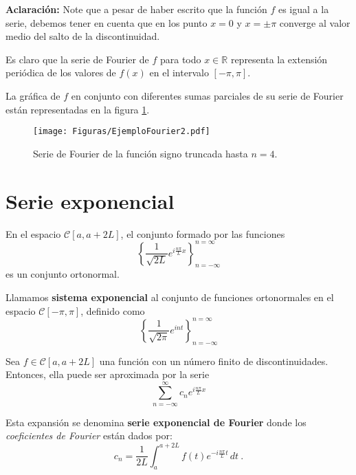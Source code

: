 \begin{ejemplo}
\textbf{Aclaración:} Note que a pesar de haber escrito que la función $f$ es igual a la serie, debemos tener en cuenta que en los punto $x = 0$ y $x = \pm \pi$ converge al valor medio del salto de la discontinuidad.

Es claro que la serie de Fourier de $f$ para todo $x\in \mathbb{R}$ representa la extensión periódica de los valores de $f(x)$ en el intervalo $[-\pi,\pi]$.

La gráfica de $f$ en conjunto con diferentes sumas parciales de su serie de Fourier están representadas en la figura \ref{fig:EjemploFourier2}.

\begin{figure}[H]
    \centering
    \texttt{[image: Figuras/EjemploFourier2.pdf]}
    \caption{Serie de Fourier de la función signo truncada hasta $n = 4$.}
     \label{fig:EjemploFourier2}
\end{figure}

\end{ejemplo}

\section{Serie exponencial}

\begin{propo}
    En el espacio $\mathscr{C}[a,a+2L]$, el conjunto formado por las funciones 
    \begin{equation}
        \left\{ \frac{1}{\sqrt{2L}} e^{i\frac{n\pi}{L}x} \right\}_{n= - \infty}^{n = \infty}
    \end{equation}
    es un conjunto ortonormal.
\end{propo}

\begin{defi} 
    Llamamos \textbf{sistema exponencial} al conjunto de funciones ortonormales en el espacio $\mathscr{C}[-\pi,\pi]$, definido como 
    $$\left\{ \frac{1}{\sqrt{2\pi}} e^{int} \right\}_{n= - \infty}^{n = \infty}$$
\end{defi}

\begin{defi} 
Sea $f \in \mathscr{C}[a,a+2L]$ una función con un número finito de discontinuidades. Entonces, ella puede ser aproximada por la serie 
\begin{equation}
     \sum_{n=- \infty}^{\infty} c_n e^{i\frac{n\pi}{L}x} \label{FourierExpo}
\end{equation}

Esta expansión se denomina \textbf{serie exponencial de Fourier}  donde los \textit{coeficientes de Fourier} están dados por:
\begin{equation*}
    c_n = \frac{1}{2L} \int_{a}^{a+2L} f(t) e^{-i\frac{n\pi}{L}t} \,dt \ .
\end{equation*}
\end{defi}

